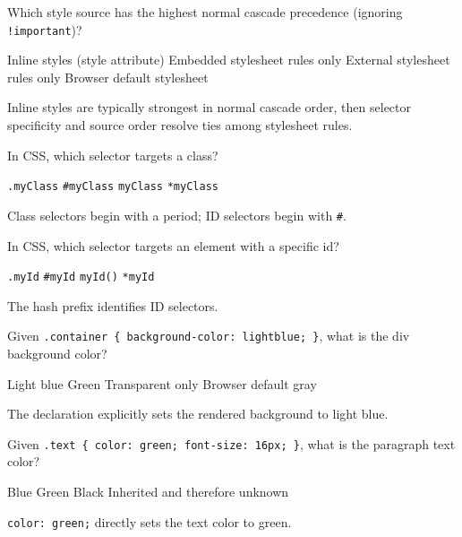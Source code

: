 \question[4]
Which style source has the highest normal cascade precedence (ignoring \texttt{!important})?
\begin{choices}
  \CorrectChoice Inline styles (style attribute)
  \choice Embedded stylesheet rules only
  \choice External stylesheet rules only
  \choice Browser default stylesheet
\end{choices}
\begin{solution}
  Inline styles are typically strongest in normal cascade order, then selector specificity and source order resolve ties among stylesheet rules.
\end{solution}

\question[4]
In CSS, which selector targets a class?
\begin{choices}
  \CorrectChoice \texttt{.myClass}
  \choice \texttt{\#myClass}
  \choice \texttt{myClass}
  \choice \texttt{*myClass}
\end{choices}
\begin{solution}
  Class selectors begin with a period; ID selectors begin with \texttt{\#}.
\end{solution}

\question[4]
In CSS, which selector targets an element with a specific id?
\begin{choices}
  \choice \texttt{.myId}
  \CorrectChoice \texttt{\#myId}
  \choice \texttt{myId()}
  \choice \texttt{*myId}
\end{choices}
\begin{solution}
  The hash prefix identifies ID selectors.
\end{solution}

\question[4]
Given \texttt{.container \{ background-color: lightblue; \}}, what is the div background color?
\begin{choices}
  \CorrectChoice Light blue
  \choice Green
  \choice Transparent only
  \choice Browser default gray
\end{choices}
\begin{solution}
  The declaration explicitly sets the rendered background to light blue.
\end{solution}

\question[4]
Given \texttt{.text \{ color: green; font-size: 16px; \}}, what is the paragraph text color?
\begin{choices}
  \choice Blue
  \CorrectChoice Green
  \choice Black
  \choice Inherited and therefore unknown
\end{choices}
\begin{solution}
  \texttt{color: green;} directly sets the text color to green.
\end{solution}

